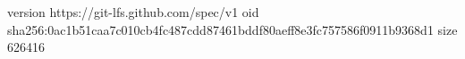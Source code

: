 version https://git-lfs.github.com/spec/v1
oid sha256:0ac1b51caa7c010cb4fc487cdd87461bddf80aeff8e3fc757586f0911b9368d1
size 626416
